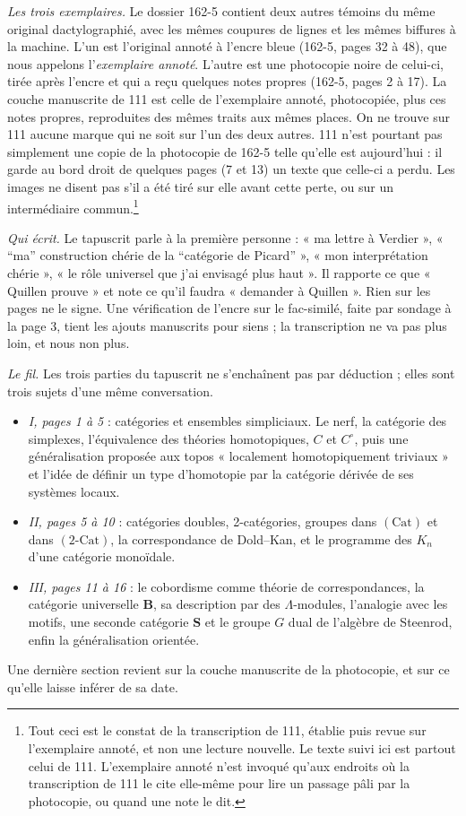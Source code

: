 \documentclass[11pt,a4paper]{article}
\begin{document}
\emph{Les trois exemplaires.} Le dossier 162-5 contient deux autres témoins du
même original dactylographié, avec les mêmes coupures de lignes et les mêmes
biffures à la machine. L'un est l'original annoté à l'encre bleue (162-5, pages
32 à 48), que nous appelons l'\emph{exemplaire annoté}. L'autre est une
photocopie noire de celui-ci, tirée après l'encre et qui a reçu quelques notes
propres (162-5, pages 2 à 17). La couche manuscrite de 111 est celle de
l'exemplaire annoté, photocopiée, plus ces notes propres, reproduites des mêmes
traits aux mêmes places. On ne trouve sur 111 aucune marque qui ne soit sur
l'un des deux autres. 111 n'est pourtant pas simplement une copie de la
photocopie de 162-5 telle qu'elle est aujourd'hui : il garde au bord droit de
quelques pages (7 et 13) un texte que celle-ci a perdu. Les images ne disent
pas s'il a été tiré sur elle avant cette perte, ou sur un intermédiaire
commun.\footnote{Tout ceci est le constat de la transcription de 111, établie
puis revue sur l'exemplaire annoté, et non une lecture nouvelle. Le texte suivi
ici est partout celui de 111. L'exemplaire annoté n'est invoqué qu'aux endroits
où la transcription de 111 le cite elle-même pour lire un passage pâli par la
photocopie, ou quand une note le dit.}

\emph{Qui écrit.} Le tapuscrit parle à la première personne : « ma lettre à
Verdier », « “ma” construction chérie de la “catégorie de Picard” », « mon
interprétation chérie », « le rôle universel que j'ai envisagé plus haut ». Il
rapporte ce que « Quillen prouve » et note ce qu'il faudra « demander à
Quillen ». Rien sur les pages ne le signe. Une vérification de l'encre sur le
fac-similé, faite par sondage à la page 3, tient les ajouts manuscrits pour
siens ; la transcription ne va pas plus loin, et nous non plus.

\emph{Le fil.} Les trois parties du tapuscrit ne s'enchaînent pas par
déduction ; elles sont trois sujets d'une même conversation.
\begin{itemize}
  \item \emph{I, pages 1 à 5} : catégories et ensembles simpliciaux. Le nerf,
  la catégorie des simplexes, l'équivalence des théories homotopiques, $C$ et
  $C^{\circ}$, puis une généralisation proposée aux topos « localement
  homotopiquement triviaux » et l'idée de définir un type d'homotopie par la
  catégorie dérivée de ses systèmes locaux.
  \item \emph{II, pages 5 à 10} : catégories doubles, 2-catégories, groupes
  dans $(\mathrm{Cat})$ et dans $(2\text{-Cat})$, la correspondance de
  Dold--Kan, et le programme des $K_n$ d'une catégorie monoïdale.
  \item \emph{III, pages 11 à 16} : le cobordisme comme théorie de
  correspondances, la catégorie universelle $\mathbf{B}$, sa description par
  des $\Lambda$-modules, l'analogie avec les motifs, une seconde catégorie
  $\mathbf{S}$ et le groupe $G$ dual de l'algèbre de Steenrod, enfin la
  généralisation orientée.
\end{itemize}
Une dernière section revient sur la couche manuscrite de la photocopie, et sur
ce qu'elle laisse inférer de sa date.
\end{document}
